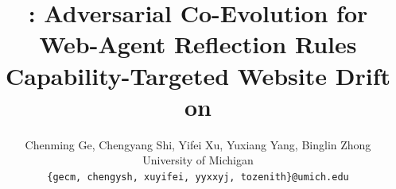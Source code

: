 \documentclass[11pt]{article}
\title{\webcoevo{}: Adversarial Co-Evolution for Web-Agent Reflection Rules\\Capability-Targeted Website Drift on \linkding{}}
\author{
  Chenming Ge, Chengyang Shi, Yifei Xu, Yuxiang Yang, Binglin Zhong \\
  University of Michigan \\
  \texttt{\{gecm, chengysh, xuyifei, yyxxyj, tozenith\}@umich.edu}
}
\begin{document}
\maketitle

\begin{abstract}

\end{abstract}









\clearpage
\onecolumn
\appendix

\end{document}

